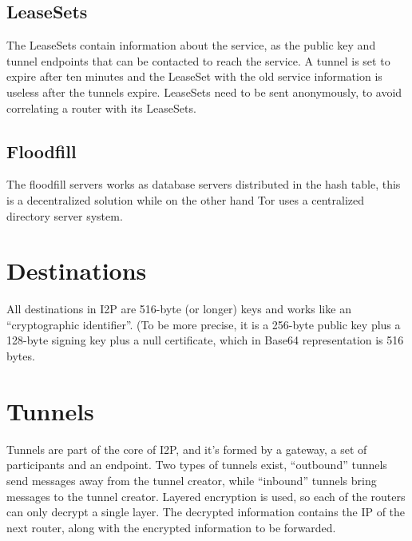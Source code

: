 \documentclass[a4paper,twocolumn,12pt]{article}
\begin{document}
\subsection{LeaseSets}

The LeaseSets contain information about the service, as the public key and
tunnel endpoints that can be contacted to reach the service. A tunnel is set to
expire after ten minutes and the LeaseSet with the old service information is
useless after the tunnels expire. LeaseSets need to be sent anonymously, to avoid
correlating a router with its LeaseSets.

\subsection{Floodfill}

The floodfill servers works as database servers distributed in the hash table,
this is a decentralized solution while on the other hand Tor\cite{tor-design}
uses a centralized directory server system.

\section{Destinations}

All destinations in I2P are 516-byte (or longer) keys and works like an ``cryptographic identifier''.
(To be more precise, it is a 256-byte public key plus a 128-byte signing
key plus a null certificate, which in Base64\cite{rfc4648} representation is 516 bytes.

\section{Tunnels}

Tunnels are part of the core of I2P, and it's formed by a gateway, a set of
participants and an endpoint. Two types of tunnels exist, ``outbound'' tunnels
send messages away from the tunnel creator, while ``inbound'' tunnels bring
messages to the tunnel creator.
Layered encryption is used, so each of the routers can only decrypt a single
layer. The decrypted information contains the IP of the next router, along with
the encrypted information to be forwarded.
\end{document}
